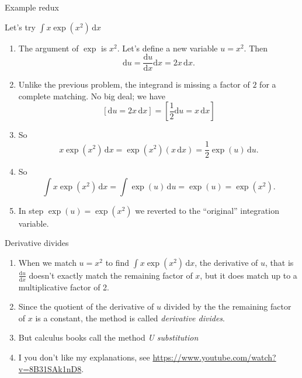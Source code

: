 \documentclass[fleqn]{beamer}
\theoremstyle{definition}
\newenvironment{checklist}{
  \begin{enumerate}[\ding{51}]
    \addtolength{\itemsep}{-0.0\itemsep}}
  {\end{enumerate}}
\begin{document}
\begin{frame}{Example redux}

Let's try  \(\int x  \exp(x^2) \, \mathrm{d} x \)

\begin{checklist}
\item  The argument of \(\exp\) is \(x^2\).  Let's define a new variable \(u = x^2\).   Then
\[
    \mathrm{d} u = \frac{\mathrm{d} u}{\mathrm{d} x} \mathrm{d} x = 2 x  \, \mathrm{d} x.
\]


\item  Unlike the previous problem, the integrand is missing a factor of \(2\) for a complete matching.  No big deal; we have
\[
  [\mathrm{d} u  =  2 x  \, \mathrm{d} x ]  =   \left [\frac{1}{2} \mathrm{d} u  =  x  \, \mathrm{d} x \right ] 
\]



\item So  
\[
    x  \exp(x^2) \, \mathrm{d} x   = \exp(x^2)     (x \,  \mathrm{d} x  ) = \frac{1}{2} \exp(u) \, \mathrm{d} u.
\]
\item So
\[
   \int x  \exp(x^2) \, \mathrm{d} x   = \int  \exp(u) \, \mathrm{d} u =  \exp(u)= \exp(x^2).
\]
\item In step   \(\exp(u) = \exp(x^2) \) we reverted to the ``original'' integration variable.

\end{checklist}

\end{frame}

\begin{frame}{Derivative divides}

\begin{checklist}

\item When we match \(u = x^2\) to find \( \int  x  \exp(x^2) \, \mathrm{d} x \),  the derivative of \(u\), that is  \(\frac{\mathrm{d} u}{\mathrm{d} x}\) doesn't exactly match the remaining factor
of \(x\),   but it does match up to a multiplicative  factor of 2.

\item Since the quotient of  the derivative of \(u\) divided by the  the remaining factor of \(x\) is a constant, the method is called \emph{derivative divides}.

\item But calculus books call the method  \emph{U substitution}

\item I you don't like my explanations, see \url{https://www.youtube.com/watch?v=8B31SAk1nD8}.

\end{checklist}
\end{frame}
\end{document}
